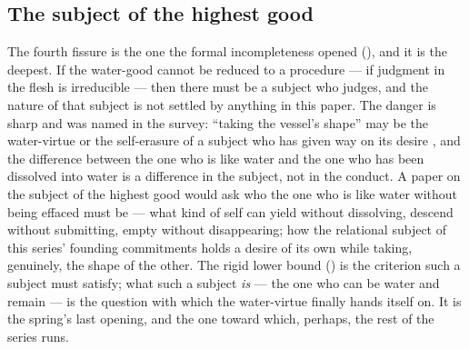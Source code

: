 \subsection{The subject of the highest good}
\label{p20:sub:fissure-subject}

The fourth fissure is the one the formal incompleteness opened (), and it is the deepest. If the water-good cannot be reduced to a procedure --- if judgment in the flesh is irreducible --- then there must be a subject who judges, and the nature of that subject is not settled by anything in this paper. The danger is sharp and was named in the survey: ``taking the vessel's shape'' may be the water-virtue or the self-erasure of a subject who has given way on its desire \parencite{lacan2006}, and the difference between the one who is like water and the one who has been dissolved into water is a difference in the subject, not in the conduct. A paper on the subject of the highest good would ask who the one who is like water without being effaced must be --- what kind of self can yield without dissolving, descend without submitting, empty without disappearing; how the relational subject of this series' founding commitments \parencite{wan2024grb} holds a desire of its own while taking, genuinely, the shape of the other. The rigid lower bound () is the criterion such a subject must satisfy; what such a subject \emph{is} --- the one who can be water and remain --- is the question with which the water-virtue finally hands itself on. It is the spring's last opening, and the one toward which, perhaps, the rest of the series runs.
